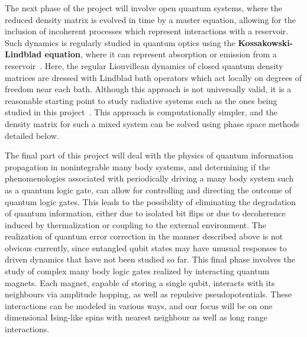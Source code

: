 \documentclass[a4paper,11pt,color]{article}
\begin{document}
The next phase of the project will involve  open quantum systems, where the reduced density matrix is evolved in time by a master equation, allowing for the inclusion of incoherent processes which represent interactions with a reservoir. Such dynamics is regularly studied in quantum optics using the \textbf{Kossakowski-Lindblad equation}, where it can represent absorption or emission from a reservoir~\cite{lindblad}. Here, the regular Liouvillean dynamics of closed quantum density matrices are dressed with Lindblad bath operators which act locally on degrees of freedom near each bath. Although this approach is not universally valid, it is a reasonable starting point to study radiative systems such as the ones being studied in this project~\cite{spinchains:lindblad}.  This approach is computationally simpler, and the density matrix for such a mixed system can be solved using phase space methods detailed below.

The final part of this project will deal with the physics of quantum information propagation in nonintegrable many body systems, and determining if the phenomenologies associated with periodically driving a many body system such as a quantum logic gate, can allow for
controlling and directing the outcome of quantum logic gates. This leads to the possibility of eliminating the degradation of quantum information, either due to isolated bit flips or due to decoherence induced by thermalization or coupling to the external environment.  The realization of quantum error correction in the manner described above is not obvious currently, since entangled qubit states may have unusual responses to driven dynamics that have not been studied so far. This final phase  involves the study of complex many body logic gates realized by interacting quantum magnets. Each magnet, capable of storing a single qubit, interacts with its neighbours via amplitude hopping, as well as repulsive pseudopotentials. These interactions can be modeled in various ways, and our focus will be on one dimensional Ising-like spins with nearest neighbour as well as long range interactions. 
\end{document}
